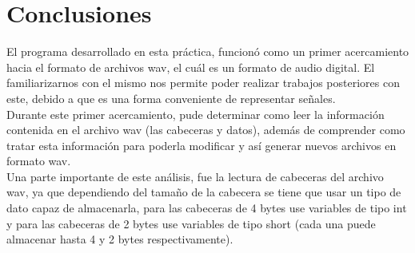 \section{Conclusiones}
El programa desarrollado en esta práctica, funcionó como un primer acercamiento hacia el formato de archivos wav, el cuál es un formato de audio digital. El familiarizarnos con el mismo nos permite poder realizar trabajos posteriores con este, debido a que es una forma conveniente de representar señales.\\ Durante este primer acercamiento, pude determinar como leer la información contenida en el archivo wav (las cabeceras y datos), además de comprender como tratar esta información para poderla modificar y así generar nuevos archivos en formato wav.\\ Una parte importante de este análisis, fue la lectura de cabeceras del archivo wav, ya que dependiendo del tamaño de la cabecera se tiene que usar un tipo de dato capaz de almacenarla, para las cabeceras de 4 bytes use variables de tipo int y para las cabeceras de 2 bytes use variables de tipo short (cada una puede almacenar hasta 4 y 2 bytes respectivamente).